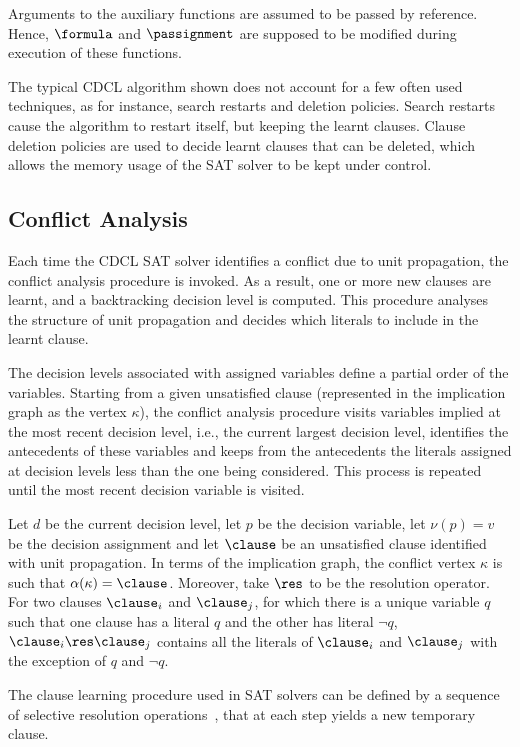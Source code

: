 Arguments to the auxiliary functions are assumed to be passed by reference.
Hence, $\formula$ and $\passignment$ are supposed to be modified during execution
of these functions.

The typical CDCL algorithm shown does not account for a few often used
techniques, as for instance, search restarts and deletion policies. Search
restarts cause the algorithm to restart itself, but keeping the learnt clauses.
Clause deletion policies are used to decide learnt clauses that can be deleted,
which allows the memory usage of the SAT solver to be kept under control.

\subsection{Conflict Analysis}%
\label{sec:conflictanalysis}

Each time the CDCL SAT solver identifies a conflict due to unit propagation, the
conflict analysis procedure is invoked. As a result, one or more new clauses are
learnt, and a backtracking decision level is computed. This procedure analyses
the structure of unit propagation and decides which literals to include in the
learnt clause.

The decision levels associated with assigned variables define a partial order of
the variables. Starting from a given unsatisfied clause (represented in the
implication graph as the vertex $\kappa$), the conflict analysis
procedure visits variables implied at the most recent decision level, i.e., the
current largest decision level, identifies the antecedents of these variables
and keeps from the antecedents the literals assigned at decision levels less
than the one being considered. This process is repeated until the most recent
decision variable is visited.

Let $d$ be the current decision level, let $p$ be the decision variable, let
$\nu(p) = v$ be the decision assignment and let $\clause$ be an unsatisfied
clause identified with unit propagation. In terms of the implication graph, the
conflict vertex $\kappa$ is such that $\alpha(\kappa) = \clause$. Moreover, take
$\res$ to be the resolution operator. For two clauses $\clause_i$ and
$\clause_j$, for which there is a unique variable $q$ such that one clause has a
literal $q$ and the other has literal $\neg q$, $\clause_i \res \clause_j$
contains all the literals of $\clause_i$ and $\clause_j$ with the exception of
$q$ and $\neg q$.

The clause learning procedure used in SAT solvers can be defined by a sequence
of selective resolution operations~\cite{journals/corr/abs-1107-0044,DAC00*675},
that at each step yields a new temporary clause. 

